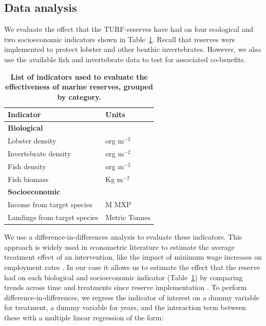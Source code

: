 \documentclass[10pt,letterpaper]{article}
\begin{document}
\clearpage

\subsection*{Data analysis}

We evaluate the effect that the TURF-reserves have had on four ecological and two socioeconomic indicators shown in Table~\ref{table:indicators}. Recall that reserves were implemented to protect lobster and other benthic invertebrates. However, we also use the available fish and invertebrate data to test for associated co-benefits.

\begin{table}[!ht]

\caption{
{\bf List of indicators used to evaluate the effectiveness of marine reserves, grouped by category.}}
\centering
\begin{tabular}{l|l}
\hline
Indicator & Units\\
\hline
\multicolumn{2}{l}{\textbf{Biological}}\\
\hline
\hspace{1em}Lobster density & org $\mathrm{m}^{-2}$\\
\hline
\hspace{1em}Invertebrate density & org $\mathrm{m}^{-2}$\\
\hline
\hspace{1em}Fish density & org $\mathrm{m}^{-2}$\\
\hline
\hspace{1em}Fish biomass & Kg $\mathrm{m}^{-2}$\\
\hline
\multicolumn{2}{l}{\textbf{Socioeconomic}}\\
\hline
\hspace{1em}Income from target species & M MXP\\
\hline
\hspace{1em}Landings from target species & Metric Tonnes\\
\hline
\end{tabular}
\label{table:indicators}
\end{table}

We use a difference-in-differences analysis to evaluate these indicators. This approach is widely used in econometric literature to estimate the average treatment effect of an intervention, like the impact of minimum wage increases on employment rates \cite{card_1994}. In our case it allows us to estimate the effect that the reserve had on each biological and socioeconomic indicator (Table~\ref{table:indicators}) by comparing trends across time and treatments since reserve implementation \cite{moland_2013,Villasenor-Derbez_2018, kerr_2019}. To perform difference-in-differences, we regress the indicator of interest on a dummy variable for treatment, a dummy variable for years, and the interaction term between these with a multiple linear regression of the form:
\end{document}

